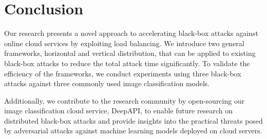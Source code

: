 \section{Conclusion}

Our research presents a novel approach to accelerating black-box attacks against online cloud services by exploiting load balancing. We introduce two general frameworks, horizontal and vertical distribution, that can be applied to existing black-box attacks to reduce the total attack time significantly. To validate the efficiency of the frameworks, we conduct experiments using three black-box attacks against three commonly used image classification models.

Additionally, we contribute to the research community by open-sourcing our image classification cloud service, DeepAPI, to enable future research on distributed black-box attacks and provide insights into the practical threats posed by adversarial attacks against machine learning models deployed on cloud servers.









